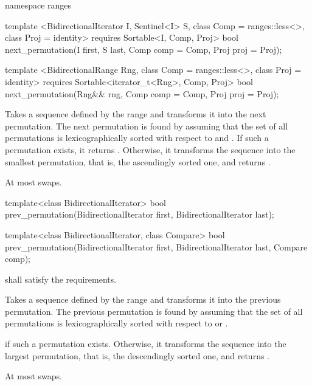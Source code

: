 \begin{addedblock}
%
\begin{itemdecl}
namespace ranges {
  template <BidirectionalIterator I, Sentinel<I> S, class Comp = ranges::less<>,
            class Proj = identity>
      requires Sortable<I, Comp, Proj>
    bool next_permutation(I first, S last, Comp comp = Comp{}, Proj proj = Proj{});

  template <BidirectionalRange Rng, class Comp = ranges::less<>, class Proj = identity>
      requires Sortable<iterator_t<Rng>, Comp, Proj>
    bool next_permutation(Rng&& rng, Comp comp = Comp{}, Proj proj = Proj{});
}
\end{itemdecl}

\begin{itemdescr}
\pnum
\effects
Takes a sequence defined by the range
and transforms it into the next permutation.
The next permutation is found by assuming that the set of all permutations is
lexicographically sorted with respect to
 and .
If such a permutation exists, it returns
.
Otherwise, it transforms the sequence into the smallest permutation,
that is, the ascendingly sorted one, and returns
.

\pnum
\complexity
At most
swaps.
\end{itemdescr}
\end{addedblock}

%
\begin{itemdecl}
template<class BidirectionalIterator>
  bool prev_permutation(BidirectionalIterator first,
                        BidirectionalIterator last);

template<class BidirectionalIterator, class Compare>
  bool prev_permutation(BidirectionalIterator first,
                        BidirectionalIterator last, Compare comp);
\end{itemdecl}

\begin{itemdescr}
\pnum
\requires
{} shall satisfy the
 requirements.

\pnum
\effects
Takes a sequence defined by the range
and transforms it into the previous permutation.
The previous permutation is found by assuming that the set of all permutations is
lexicographically sorted with respect to
or .

\pnum
\returns
{}
if such a permutation exists.
Otherwise, it transforms the sequence into the largest permutation,
that is, the descendingly sorted one, and returns
.

\pnum
\complexity
At most
swaps.
\end{itemdescr}

